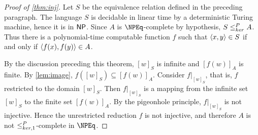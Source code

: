 \begin{proof}[Proof of \autoref{thm:inj}]
  Let $S$ be the equivalence relation defined in the preceding paragraph.
  The language $S$ is decidable in linear time by a deterministic Turing machine, hence it is in ${\mathsf{NP}}$.
  Since $A$ is $\NPEq$-complete by hypothesis, $S \leq^{P}_{ker} A$.
  Thus there is a polynomial-time computable function $f$ such that $\langle x,y\rangle \in S$ if and only if $\langle f(x),f(y)\rangle \in A$.

  By the discussion preceding this theorem, $[w]_S$ is infinite and $[f(w)]_A$ is finite.
  By \autoref{lem:image}, $f([w]_S) \subseteq [f(w)]_A$.
  Consider $f|_{[w]_S}$, that is, $f$ restricted to the domain $[w]_S$.
  Then $f|_{[w]_S}$ is a mapping from the infinite set $[w]_S$ to the finite set $[f(w)]_A$.
  By the pigeonhole principle, $f|_{[w]_S}$ is not injective.
  Hence the unrestricted reduction $f$ is not injective, and therefore $A$ is not $\leq^{P}_{ker,1}$-complete in $\NPEq$.
\end{proof}
